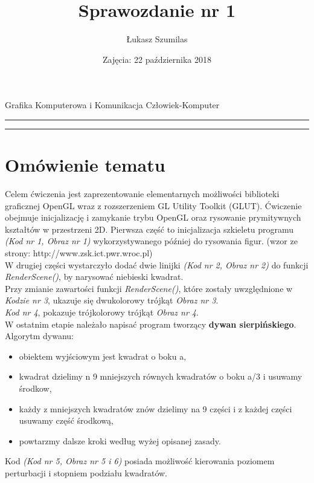 \documentclass[polish,polish,a4paper]{article}
\title{Sprawozdanie nr 1}
\author{Łukasz Szumilas}
\date{Zajęcia: 22 października 2018}
\begin{document}
  \begin{center}\Large
    Grafika Komputerowa i Komunikacja Człowiek-Komputer
  \end{center}
  \hrule
  {\let\newpage\relax\maketitle}
  \hrule


  \section{Omówienie tematu}
   Celem ćwiczenia jest zaprezentowanie elementarnych możliwości biblioteki graficznej OpenGL wraz z rozszerzeniem GL Utility Toolkit (GLUT). Ćwiczenie  obejmuje inicjalizację i zamykanie trybu OpenGL oraz rysowanie prymitywnych kształtów w przestrzeni 2D. 
   Pierwsza część to inicjalizacja szkieletu programu \textit{(Kod nr 1, Obraz nr 1)} wykorzystywanego później do rysowania figur.
(wzor ze strony: http://www.zsk.ict.pwr.wroc.pl)
\\\indent W drugiej części wystarczyło dodać dwie linijki \textit{(Kod nr 2, Obraz nr 2)} do funkcji \textit{RenderScene()}, by narysować niebieski kwadrat. 
\\\indent Przy zmianie zawartości funkcji \textit{RenderScene()}, które zostały uwzględnione w \textit{Kodzie nr 3}, ukazuje się dwukolorowy trójkąt \textit{Obraz nr 3}.
 \\\indent \textit{Kod nr 4}, pokazuje trójkolorowy trójkąt \textit{Obraz nr 4}.
\\\indent W ostatnim etapie należało napisać program tworzący \textbf{dywan sierpińskiego}. Algorytm dywanu: 
\begin{itemize}
\item  obiektem wyjściowym jest kwadrat o boku a,
\item  kwadrat dzielimy n 9 mniejszych równych kwadratów  o boku a/3 i  usuwamy środkow,
\item  każdy z mniejszych kwadratów  znów dzielimy na 9 części i  z każdej części usuwamy część środkową,
\item  powtarzmy dalsze kroki według wyżej opisanej zasady.
\end{itemize}
 Kod \textit{(Kod nr 5, Obraz nr 5 i 6)} posiada możliwość kierowania poziomem perturbacji i stopniem podziału kwadratów.
\end{document}
